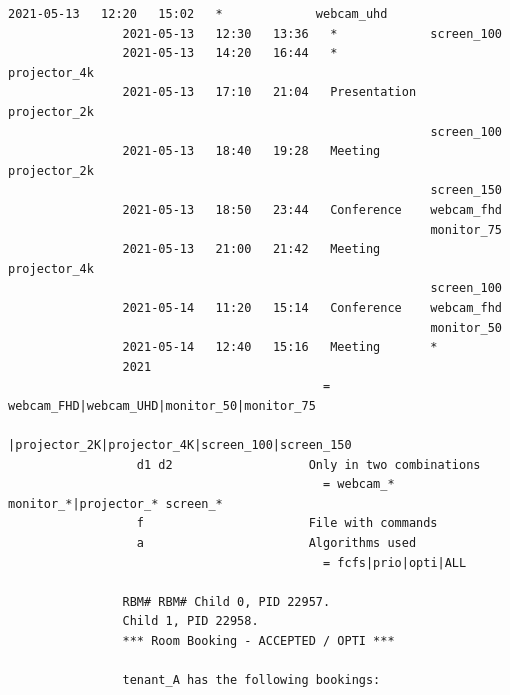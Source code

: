 \documentclass{article}
\begin{document}
\begin{Verbatim}[gobble=8]
                2021-05-13   12:20   15:02   *             webcam_uhd
                2021-05-13   12:30   13:36   *             screen_100
                2021-05-13   14:20   16:44   *             projector_4k
                2021-05-13   17:10   21:04   Presentation  projector_2k
                                                           screen_100
                2021-05-13   18:40   19:28   Meeting       projector_2k
                                                           screen_150
                2021-05-13   18:50   23:44   Conference    webcam_fhd
                                                           monitor_75
                2021-05-13   21:00   21:42   Meeting       projector_4k
                                                           screen_100
                2021-05-14   11:20   15:14   Conference    webcam_fhd
                                                           monitor_50
                2021-05-14   12:40   15:16   Meeting       *
                2021           
                                            = webcam_FHD|webcam_UHD|monitor_50|monitor_75     
                                              |projector_2K|projector_4K|screen_100|screen_150
                  d1 d2                   Only in two combinations                            
                                            = webcam_* monitor_*|projector_* screen_*         
                  f                       File with commands                                  
                  a                       Algorithms used                                     
                                            = fcfs|prio|opti|ALL                              
                
                RBM# RBM# Child 0, PID 22957.
                Child 1, PID 22958.
                *** Room Booking - ACCEPTED / OPTI ***
                
                tenant_A has the following bookings:
                

\end{Verbatim}
\end{document}
